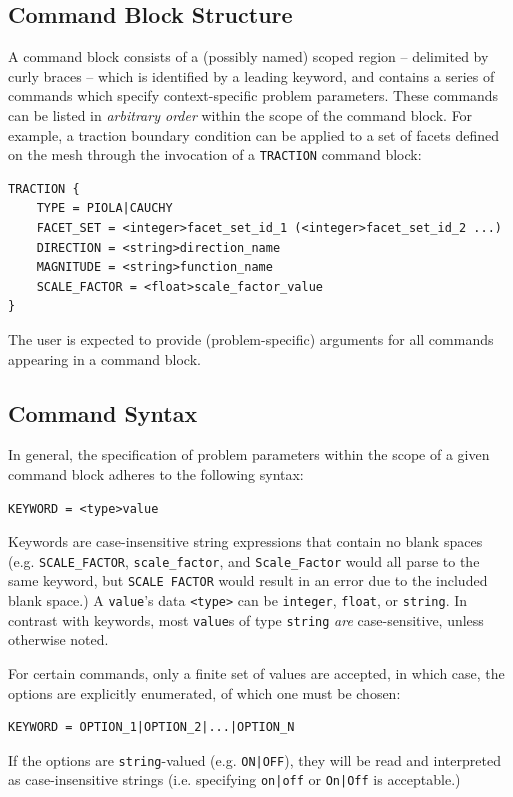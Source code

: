 \documentclass[11pt]{article} %
\begin{document}
\subsection{Command Block Structure} A command block consists of a (possibly named) scoped region -- delimited by curly braces -- which is identified by a leading keyword, and contains a series of commands which specify context-specific problem parameters. These commands can be listed in \textit{arbitrary order} within the scope of the command block. For example, a traction boundary condition can be applied to a set of facets defined on the mesh through the invocation of a \texttt{TRACTION} command block:
\begin{lstlisting}
TRACTION {
	TYPE = PIOLA|CAUCHY
	FACET_SET = <integer>facet_set_id_1 (<integer>facet_set_id_2 ...)
	DIRECTION = <string>direction_name
	MAGNITUDE = <string>function_name
	SCALE_FACTOR = <float>scale_factor_value
}
\end{lstlisting}
The user is expected to provide (problem-specific) arguments for all commands appearing in a command block. 

\subsection{Command Syntax} In general, the specification of problem parameters within the scope of a given command block adheres to the following syntax:
\begin{lstlisting}
KEYWORD = <type>value
\end{lstlisting}
Keywords are case-insensitive string expressions that contain no blank spaces (e.g. \texttt{SCALE\_FACTOR}, \texttt{scale\_factor}, and \texttt{Scale\_Factor} would all parse to the same keyword, but \texttt{SCALE FACTOR} would result in an error due to the included blank space.) A \texttt{value}'s data \texttt{<type>} can be \texttt{integer}, \texttt{float}, or \texttt{string}. In contrast with keywords, most \texttt{value}s of type \texttt{string} \textit{are} case-sensitive, unless otherwise noted.

For certain commands, only a finite set of values are accepted, in which case, the options are explicitly enumerated, of which one must be chosen:
\begin{lstlisting}
KEYWORD = OPTION_1|OPTION_2|...|OPTION_N
\end{lstlisting}
If the options are \texttt{string}-valued (e.g. \texttt{ON|OFF}), they will be read and interpreted as case-insensitive strings (i.e. specifying \texttt{on|off} or \texttt{On|Off} is acceptable.)
\end{document}
